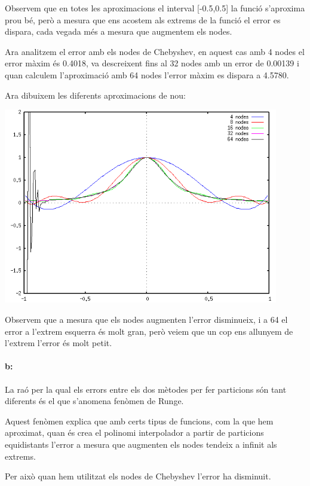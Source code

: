 \documentclass{article}
\begin{document}
	Observem que en totes les aproximacions el interval [-0.5,0.5] la funció s'aproxima prou bé, però a mesura que ens acostem als extrems de la funció el error es dispara, cada vegada més a mesura que augmentem els nodes.
	
	Ara analitzem el error amb els nodes de Chebyshev, en aquest cas amb 4 nodes el error màxim és 0.4018, va descreixent fins al 32 nodes amb un error de 0.00139 i quan calculem l'aproximació amb 64 nodes l'error màxim es dispara a 4.5780.
	
	Ara dibuixem les diferents aproximacions de nou:
	
	\begin{center}
		\includegraphics[width=12cm]{cheb.png}
	\end{center}
	
	Observem que a mesura que els nodes augmenten l'error disminueix, i a 64 el error a l'extrem esquerra és molt gran, però veiem que un cop ens allunyem de l'extrem l'error és molt petit.
	
	\paragraph{b:} La raó per la qual els errors entre els dos mètodes per fer particions són tant diferents és el que s'anomena fenòmen de Runge.
	
	Aquest fenòmen explica que amb certs tipus de funcions, com  la que hem aproximat, quan és crea el polinomi interpolador a partir de particions equidistants l'error a mesura que augmenten els nodes tendeix a infinit als extrems.
	
	Per això quan hem utilitzat els nodes de Chebyshev l'error ha disminuit.
	
	\newpage
	
\end{document}
